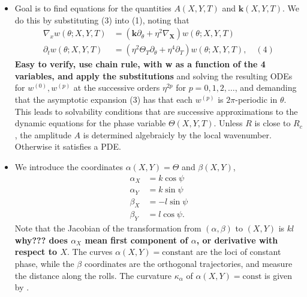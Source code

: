 \documentclass[12pt]{article}
\begin{document}
\begin{itemize}
    \item Goal is to find equations for the quantities $A(X,Y,T)$ and $\bm{k}(X,Y,T)$. We do this by substituting (3) into (1), noting that
        \begin{align*}
            \nabla_x w(\theta ; X,Y,T) &= (\bm{k}\partial_\theta + \eta^2 \nabla_{\bm{X}})w(\theta;X,Y,T)\\
            \partial_t w(\theta; X,Y,T) &= (\eta^2\Theta_T\partial_\theta +\eta^4\partial_T)w(\theta;X,Y,T), \quad (4)
        \end{align*}
        \textbf{Easy to verify, use chain rule, with w as a function of the 4 variables, and apply the substitutions}
        and solving the resulting ODEs for $w^{(0)}, w^{(p)}$ at the successive orders $\eta^{2p}$ for $p=0,1,2,\dots$, and demanding that the asymptotic expansion (3) has that each $w^{(p)}$ is $2\pi$-periodic in $\theta$. This leads to solvability conditions that are successive approximations to the dynamic equations for the phase variable $\Theta(X,Y,T)$. Unless $R$ is close to $R_c$, the amplitude $A$ is determined algebraicly by the local wavenumber. Otherwise it satisfies a PDE.
    \item We introduce the coordinates $\alpha(X,Y)=\Theta$ and $\beta(X,Y)$,
        \begin{align*}
            \alpha_X &= k\cos\psi\\
            \alpha_Y &= k\sin\psi\\
            \beta_X &= -l\sin\psi\\
            \beta_Y &= l\cos\psi.
        \end{align*}
        Note that the Jacobian of the transformation from $(\alpha,\beta)$ to $(X,Y)$ is $kl$ \textbf{why??? does $\alpha_X$ mean first component of $\alpha$, or derivative with respect to $X$}.\newline
        The curves $\alpha(X,Y)=\text{constant}$ are the loci of constant phase, while the $\beta$ coordinates are the orthogonal trajectories, and measure the distance along the rolls. The curvature $\kappa_{\alpha}$ of $\alpha(X,Y)=\text{const}$ is given by .


\end{itemize}
\end{document}
